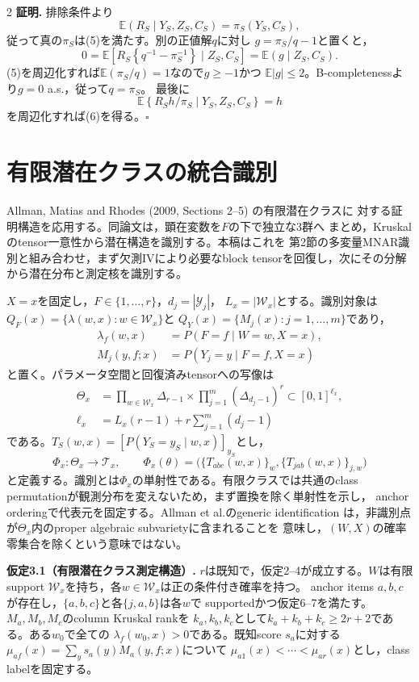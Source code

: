 \documentclass[a4paper,10pt]{article}
\newcommand{\E}{\mathbb E}
\begin{document}
\begin{multicols}{2}
\noindent\textbf{証明.}
排除条件より
\[
\E(R_S\mid Y_S,Z_S,C_S)=\pi_S(Y_S,C_S),
\]
従って真の$\pi_S$は(5)を満たす。別の正値解$q$に対し
$g=\pi_S/q-1$と置くと，
\[
0=\E\left[R_S\left\{q^{-1}-\pi_S^{-1}\right\}\mid Z_S,C_S\right]
=\E(g\mid Z_S,C_S).
\]
(5)を周辺化すれば$\E(\pi_S/q)=1$なので$g\ge-1$かつ
$\E|g|\le2$。B-completenessより$g=0$ a.s.，従って$q=\pi_S$。
最後に
\[
\E\left\{R_Sh/\pi_S\mid Y_S,Z_S,C_S\right\}=h
\]
を周辺化すれば(6)を得る。\hfill$\square$

\begingroup
\scriptsize
\section{有限潜在クラスの統合識別}
Allman, Matias and Rhodes (2009, Sections 2--5) の有限潜在クラスに
対する証明構造を応用する。同論文は，顕在変数を$F$の下で独立な3群へ
まとめ，Kruskalのtensor一意性から潜在構造を識別する。本稿はこれを
第2節の多変量MNAR識別と組み合わせ，まず欠測IVにより必要なblock
tensorを回復し，次にその分解から潜在分布と測定核を識別する。

$X=x$を固定し，$F\in\{1,\ldots,r\}$，$d_j=|\mathcal Y_j|$，
$L_x=|\mathcal W_x|$とする。識別対象は
$Q_F(x)=\{\lambda(w,x):w\in\mathcal W_x\}$と
$Q_Y(x)=\{M_j(x):j=1,\ldots,m\}$であり，
\begin{align*}
\lambda_f(w,x)&=P(F=f\mid W=w,X=x),\\
M_j(y,f;x)&=P(Y_j=y\mid F=f,X=x)
\end{align*}
と置く。パラメータ空間と回復済みtensorへの写像は
\begin{align*}
\Theta_x&=\prod_{w\in\mathcal W_x}\Delta_{r-1}
 \times\prod_{j=1}^m(\Delta_{d_j-1})^r
 \subset[0,1]^{\ell_x},\\
\ell_x&=L_x(r-1)+r\sum_{j=1}^m(d_j-1)
\end{align*}
である。$T_S(w,x)=[P(Y_S=y_S\mid w,x)]_{y_S}$とし，
\[
\Phi_x:\Theta_x\to\mathcal T_x,\qquad
\Phi_x(\theta)=
\big(\{T_{abc}(w,x)\}_w,\{T_{jab}(w,x)\}_{j,w}\big)
\]
と定義する。識別とは$\Phi_x$の単射性である。有限クラスでは共通のclass
permutationが観測分布を変えないため，まず置換を除く単射性を示し，
anchor orderingで代表元を固定する。Allman et al.のgeneric identification
は，非識別点が$\Theta_x$内のproper algebraic subvarietyに含まれることを
意味し，$(W,X)$の確率零集合を除くという意味ではない。

\noindent\textbf{仮定3.1（有限潜在クラス測定構造）.}
$r$は既知で，仮定2--4が成立する。$W$は有限support
$\mathcal W_x$を持ち，各$w\in\mathcal W_x$は正の条件付き確率を持つ。
anchor items $a,b,c$が存在し，$\{a,b,c\}$と各$\{j,a,b\}$は各$w$で
supportedかつ仮定6--7を満たす。$M_a,M_b,M_c$のcolumn Kruskal rankを
$k_a,k_b,k_c$として$k_a+k_b+k_c\ge2r+2$である。ある$w_0$で全ての
$\lambda_f(w_0,x)>0$である。既知score $s_a$に対する
$\mu_{af}(x)=\sum_y s_a(y)M_a(y,f;x)$について
$\mu_{a1}(x)<\cdots<\mu_{ar}(x)$とし，class labelを固定する。


\end{multicols}
\end{document}
